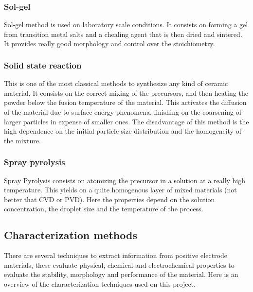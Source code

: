 \documentclass{article}
\begin{document}
\subsubsection{Sol-gel}
Sol-gel method is used on laboratory scale conditions. It consists on forming a gel from transition 
metal salts and a chealing agent that is then dried and sintered. It provides really good morphology and control over the stoichiometry\cite{process}.

\subsubsection{Solid state reaction}
This is one of the most classical methods to synthesize any kind of ceramic material. 
It consists on the correct mixing of the precursors, and then heating the powder below the fusion temperature of the material.
This activates the diffusion of the material due to surface energy phenomena, finishing on the coarsening of larger particles
in expense of smaller ones. The disadvantage of this method is the high dependence on the initial particle size distribution and 
the homogeneity of the mixture\cite{process}.

\subsubsection{Spray pyrolysis}
Spray Pyrolysis consists on atomizing the precursor in a solution at a really high temperature. This yields on a 
quite homogenous layer of mixed materials (not better that CVD or PVD). Here the properties depend on the solution concentration, the 
droplet size and the temperature of the process\cite{process}.

\subsection{Characterization methods}
There are several techniques to extract information from positive electrode materials,
these evaluate physical, chemical and electrochemical properties to evaluate the stability, morphology 
and performance of the material. Here is an overview of the characterization techniques used on this project.\\
\end{document}
